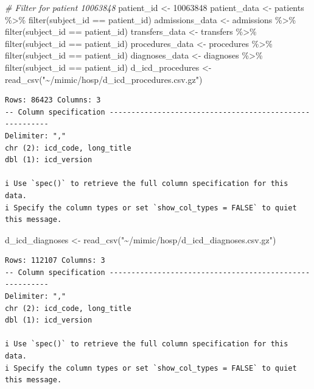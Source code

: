 \documentclass[
]{article}
\newenvironment{Shaded}{\begin{snugshade}}{\end{snugshade}}
\newcommand{\CommentTok}[1]{\textcolor[rgb]{0.56,0.35,0.01}{\textit{#1}}}
\newcommand{\DecValTok}[1]{\textcolor[rgb]{0.00,0.00,0.81}{#1}}
\newcommand{\FunctionTok}[1]{\textcolor[rgb]{0.00,0.00,0.00}{#1}}
\newcommand{\NormalTok}[1]{\textcolor[rgb]{0.00,0.00,0.00}{#1}}
\newcommand{\OtherTok}[1]{\textcolor[rgb]{0.56,0.35,0.01}{#1}}
\newcommand{\SpecialCharTok}[1]{\textcolor[rgb]{0.00,0.00,0.00}{#1}}
\newcommand{\StringTok}[1]{\textcolor[rgb]{0.31,0.60,0.02}{#1}}
\begin{document}
\begin{Shaded}
\begin{Highlighting}[]
\CommentTok{\# Filter for patient 10063848}
\NormalTok{patient\_id }\OtherTok{\textless{}{-}} \DecValTok{10063848}
\NormalTok{patient\_data }\OtherTok{\textless{}{-}}\NormalTok{ patients }\SpecialCharTok{\%\textgreater{}\%} \FunctionTok{filter}\NormalTok{(subject\_id }\SpecialCharTok{==}\NormalTok{ patient\_id)}
\NormalTok{admissions\_data }\OtherTok{\textless{}{-}}\NormalTok{ admissions }\SpecialCharTok{\%\textgreater{}\%} \FunctionTok{filter}\NormalTok{(subject\_id }\SpecialCharTok{==}\NormalTok{ patient\_id)}
\NormalTok{transfers\_data }\OtherTok{\textless{}{-}}\NormalTok{ transfers }\SpecialCharTok{\%\textgreater{}\%} \FunctionTok{filter}\NormalTok{(subject\_id }\SpecialCharTok{==}\NormalTok{ patient\_id)}
\NormalTok{procedures\_data }\OtherTok{\textless{}{-}}\NormalTok{ procedures }\SpecialCharTok{\%\textgreater{}\%} \FunctionTok{filter}\NormalTok{(subject\_id }\SpecialCharTok{==}\NormalTok{ patient\_id)}
\NormalTok{diagnoses\_data }\OtherTok{\textless{}{-}}\NormalTok{ diagnoses }\SpecialCharTok{\%\textgreater{}\%} \FunctionTok{filter}\NormalTok{(subject\_id }\SpecialCharTok{==}\NormalTok{ patient\_id)}
\NormalTok{d\_icd\_procedures }\OtherTok{\textless{}{-}} \FunctionTok{read\_csv}\NormalTok{(}\StringTok{"\textasciitilde{}/mimic/hosp/d\_icd\_procedures.csv.gz"}\NormalTok{)}
\end{Highlighting}
\end{Shaded}

\begin{verbatim}
Rows: 86423 Columns: 3
-- Column specification --------------------------------------------------------
Delimiter: ","
chr (2): icd_code, long_title
dbl (1): icd_version

i Use `spec()` to retrieve the full column specification for this data.
i Specify the column types or set `show_col_types = FALSE` to quiet this message.
\end{verbatim}

\begin{Shaded}
\begin{Highlighting}[]
\NormalTok{d\_icd\_diagnoses }\OtherTok{\textless{}{-}} \FunctionTok{read\_csv}\NormalTok{(}\StringTok{"\textasciitilde{}/mimic/hosp/d\_icd\_diagnoses.csv.gz"}\NormalTok{)}
\end{Highlighting}
\end{Shaded}

\begin{verbatim}
Rows: 112107 Columns: 3
-- Column specification --------------------------------------------------------
Delimiter: ","
chr (2): icd_code, long_title
dbl (1): icd_version

i Use `spec()` to retrieve the full column specification for this data.
i Specify the column types or set `show_col_types = FALSE` to quiet this message.
\end{verbatim}
\end{document}
